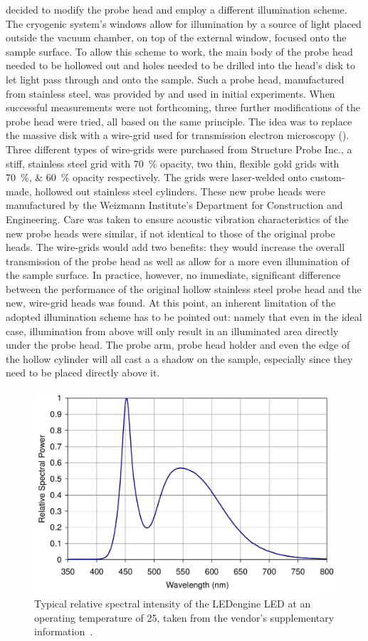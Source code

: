 decided to modify the probe head and employ a different illumination scheme. The cryogenic system's windows allow for illumination by a source of light placed outside the vacuum chamber, on top of the external window, focused onto the sample surface. To allow this scheme to work, the main body of the probe head needed to be hollowed out and holes needed to be drilled into the head's disk to let light pass through and onto the sample. Such a probe head, manufactured from stainless steel, was provided by \McA{} and used in initial experiments. When successful measurements were not forthcoming, three further modifications of the probe head were tried, all based on the same principle. The idea was to replace the massive disk with a wire-grid used for transmission electron microscopy (\tem{}). Three different types of wire-grids were purchased from Structure Probe Inc., a stiff, stainless steel grid with \SI{70}{\percent} opacity, two thin, flexible gold grids with \SIlist{70;60}{\percent} opacity respectively. The grids were laser-welded onto custom-made, hollowed out stainless steel cylinders. These new probe heads were manufactured by the Weizmann Institute's Department for Construction and Engineering. Care was taken to ensure acoustic vibration characteristics of the new probe heads were similar, if not identical to those of the original \McA{} probe heads. The wire-grids would add two benefits: they would increase the overall transmission of the probe head as well as allow for a more even illumination of the sample surface. In practice, however, no immediate, significant difference between the performance of the original hollow stainless steel probe head and the new, \tem{} wire-grid heads was found. At this point, an inherent limitation of the adopted illumination scheme has to be pointed out: namely that even in the ideal case, illumination from above will only result in an illuminated area directly under the probe head. The probe arm, probe head holder and even the edge of the hollow cylinder will all cast a a shadow on the sample, especially since they need to be placed directly above it.\\
\begin{figure}
\centering
	\includegraphics[width=0.8\linewidth]{./figs/ledspec}
	\caption{Typical relative spectral intensity of the LEDengine LED at an operating temperature of 25\degcent{}, taken from the vendor's supplementary information~\cite[p. 10]{ledengin}.}
	\label{fig:ledspec}
\end{figure}
